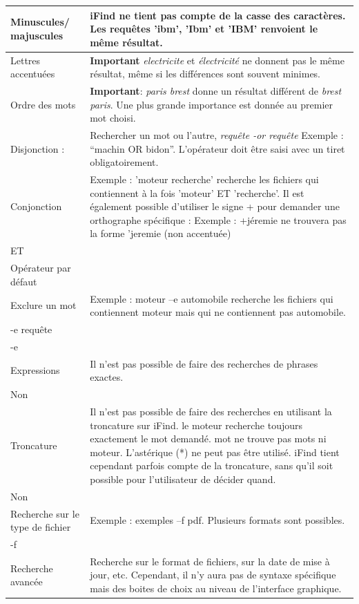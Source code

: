 \documentclass[a4paper,10pt]{article}
\begin{document}
\begin{tabular}{|p{4cm}|p{10cm}|}
\hline
Minuscules/ majuscules & iFind ne tient pas compte de la casse des caractères.
Les requêtes 'ibm', 'Ibm' et 'IBM' renvoient le même résultat.\\
\hline
Lettres accentuées & \textbf{Important} \textit{electricite} et
\textit{électricité} ne donnent pas le même résultat, même si les différences
sont souvent minimes.\\
\hline
Ordre des mots & \textbf{Important}: \textit{paris brest } donne un résultat 
différent de \textit{brest paris}. Une plus grande importance est donnée au
premier 
mot choisi.\\
\hline
Disjonction : & Rechercher un mot ou  l'autre, \textit{requête -or requête}
Exemple : “machin OR bidon”. L'opérateur doit être saisi avec un tiret
obligatoirement.\\
\hline
Conjonction & Exemple : 'moteur recherche' recherche les
fichiers qui contiennent à la fois 'moteur' ET 'recherche'. Il est également
possible d'utiliser le signe + pour demander une orthographe spécifique :
Exemple : +jéremie ne trouvera pas la forme 'jeremie (non accentuée)\\
ET & \\
Opérateur par défaut & \\
\hline
Exclure un mot & Exemple : moteur –e automobile recherche les fichiers qui
contiennent moteur
mais qui ne contiennent pas automobile.\\
-e requête & \\
-e & \\
\hline
Expressions & Il n'est pas possible de faire des recherches de phrases
exactes.\\
Non & \\
\hline
Troncature & Il n'est pas possible de faire des recherches en utilisant la
troncature sur iFind. le moteur recherche toujours exactement le mot demandé.
mot ne trouve pas
mots ni moteur. L'astérique (*) ne peut pas être utilisé. iFind tient cependant
parfois compte de la troncature, sans qu'il soit possible pour l'utilisateur de
décider quand.\\
Non & \\
\hline
 Recherche sur le type   de fichier & Exemple : exemples –f pdf. Plusieurs
formats sont possibles.\\
 -f & \\
\hline
Recherche avancée & Recherche sur le format de fichiers, sur la date de mise à
jour, etc. Cependant,
il n’y aura pas de syntaxe spécifique mais des boites de choix au niveau de
l’interface graphique.\\
\hline
\end{tabular}
 
\end{document}
